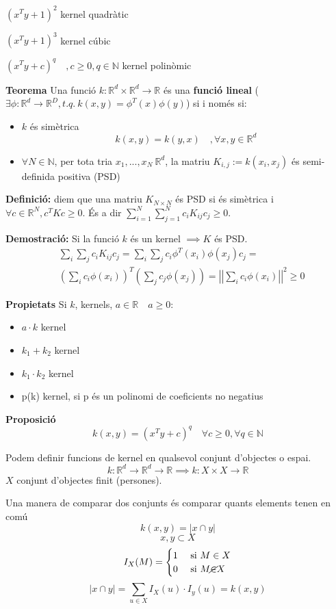 $(x^Ty + 1)^2$ kernel quadràtic

$(x^Ty + 1)^3$ kernel cúbic

$(x^Ty + c)^q \quad ,c \ge 0, q \in \mathbb{N}$ kernel polinòmic

\textbf{Teorema} Una funció $k:\mathbb{R}^d \times \mathbb{R}^d \rightarrow \mathbb{R}$ és una \textbf{funció lineal} ($\exists \phi: \mathbb{R}^d \rightarrow \mathbb{R}^D, t.q. \ k(x,y) = \phi^T(x)\phi(y)$) si i només si:
\begin{itemize}
	\item $k$ és simètrica
	$$
		k(x,y) = k(y,x) \quad ,\forall x,y \in \mathbb{R}^d
	$$
	\item $\forall N \in \mathbb{N}$, per tota tria $x_1,...,x_N \ \mathbb{R}^d$, la matriu $K_{i,j} := k(x_i, x_j)$ és semi-definida positiva (PSD)
\end{itemize}

\textbf{Definició:} diem que una matriu $K_{N \times N}$ és PSD si és simètrica i $\forall c \in \mathbb{R}^N, c^T K c \ge 0$. És a dir $\sum_{i=1}^N\sum_{j=1}^N c_i K_{ij} c_j \ge 0$.

\textbf{Demostració:} Si la funció $k$ és un kernel $\implies K$ és PSD.
\begin{align*}
	& \sum_i \sum_j c_i K_{ij} c_j = 
	\sum_i \sum_j c_i \phi^T(x_i) \phi(x_j)c_j = \\
	& \left( \sum_i c_i \phi(x_i) \right)^T
	\left( \sum_j c_j \phi(x_j) \right) = 
	\left|\left| \sum_i c_i \phi(x_i) \right|\right|^2 \ge 0
\end{align*}

\textbf{Propietats}
Si $k$, kernels, $a \in \mathbb{R} \quad a \ge 0$:
\begin{itemize}
	\item $a·k$ kernel
	\item $k_1 + k_2$ kernel
	\item $k_1·k_2$ kernel
	\item p(k) kernel, si p és un polinomi de coeficients no negatius
\end{itemize}

\textbf{Proposició}
$$
k(x,y) = (x^Ty + c)^q \quad \forall c \ge 0, \forall q \in \mathbb{N}
$$

Podem definir funcions de kernel en qualsevol conjunt d'objectes o espai.
$$
k: \mathbb{R}^d \rightarrow \mathbb{R}^d 
\rightarrow \mathbb{R} \implies 
k: X \times X \rightarrow \mathbb{R}
$$
$X$ conjunt d'objectes finit (persones).

Una manera de comparar dos conjunts és comparar quants elements tenen en comú
$$
k(x,y) = | x \cap y|
$$
$$
x,y \subset X
$$
$$
I_X (M) = \begin{cases}
1 & \text{ si } M \in X \\
0 & \text{ si } M \cancel{\in} X
\end{cases}
$$
$$
|x \cap y| = \sum_{u \in X} I_X(u)·I_y(u) = k(x,y)
$$

